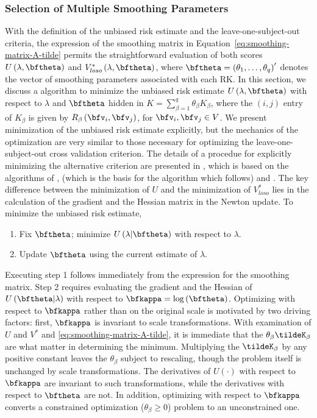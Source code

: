 \subsubsection{Selection of Multiple Smoothing Parameters}

With the definition of the unbiased risk estimate and the leave-one-subject-out criteria, the expression of the smoothing matrix in Equation~\ref{eq:smoothing-matrix-A-tilde} permits the straightforward evaluation of both scores $U\left(\lambda, \bftheta \right)$ and $V_{loso}^*\left(\lambda, \bftheta \right)$, where $\bftheta = \left(\theta_1,\dots, \theta_q\right)'$ denotes the vector of smoothing parameters associated with each RK.  In this section, we discuss a algorithm to minimize the unbiased risk estimate $U\left(\lambda, \bftheta\right)$ with respect to $\lambda$ and $\bftheta$ hidden in $K = \sum_{\beta = 1}^q \theta_\beta K_\beta$, where the $\left(i,j\right)$ entry of $K_\beta$ is given by $R_\beta\left(\bfv_i,\bfv_j\right)$, for $\bfv_i,\bfv_j \in V$.  We present minimization of the unbiased risk estimate explicitly, but the mechanics of the optimization are very similar to those necessary for optimizing the leave-one-subject-out cross validation criterion. The details of a procedue for explicitly minimizing the alternative criterion are presented in \cite{xu2012asymptotic}, which is based on the algorithms of \cite{gu1991minimizing}, \cite{kim2004smoothing} (which is the basis for the algorithm which follows) and \cite{wood2004stable}. The key difference between the minimization of $U$ and the minimization of $V^*_{loso}$ lies in the calculation of the gradient and the Hessian matrix in the Newton update. To minimize the unbiased risk estimate,

\begin{enumerate}
\item Fix $\bftheta$; minimize $U\left(\lambda \vert \bftheta\right)$ with respect to $\lambda$.
\item Update $\bftheta$ using the current estimate of $\lambda$.
\end{enumerate}

\noindent
Executing step 1 follows immediately from the expression for the smoothing matrix. Step 2 requires evaluating the gradient and the Hessian of $U\left( \bftheta \vert \lambda \right)$ with respect to $\bfkappa = \log\left(\bftheta\right)$. Optimizing with respect to $\bfkappa$ rather than on the original scale is motivated by two driving factors: first, $\bfkappa$ is invariant to scale transformations. With examination of $U$ and $V^*$ and \ref{eq:smoothing-matrix-A-tilde}, it is immediate that the $\theta_\beta \tildeK_\beta$ are what matter in determining the minimum. Multiplying the $\tildeK_\beta$ by any positive constant leaves the $\theta_\beta$ subject to rescaling, though the problem itself is unchanged by scale transformations. The derivatives of $U\left(\cdot\right)$ with respect to $\bfkappa$ are invariant to such transformations, while the derivatives with respect to $\bftheta$ are not. In addition, optimizing with respect to $\bfkappa$ converts a constrained optimization ($\theta_\beta \ge 0$) problem to an unconstrained one.

